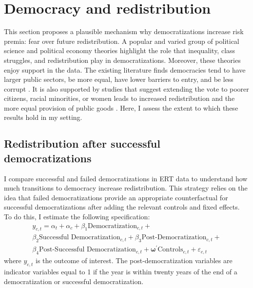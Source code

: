 \section{Democracy and redistribution}\label{section:redistribution}

This section proposes a plausible mechanism why democratizations increase risk premia: fear over future redistribution. A popular and varied group of political science and political economy theories highlight the role that inequality, class struggles, and redistribution play in democratizations.  Moreover, these theories enjoy support in the data. The existing literature finds democracies tend to have larger public sectors, be more equal, have lower barriers to entry, and be less corrupt \citep{Fisman2001,Boix2003,Kolstad2016,Acemoglu2015,Rock2016}. It is also supported by studies that suggest extending the vote to poorer citizens, racial minorities, or women leads to increased redistribution and the more equal provision of public goods \citep{Husted1997,Miller2008,Naidu2012,Cascio2013,Fujiwara2015}. Here, I assess the extent to which these results hold in my setting.

\subsection{Redistribution after successful democratizations}\label{section:redistribution_emp}

I compare successful and failed democratizations in ERT data to understand how much transitions to democracy increase redistribution. This strategy relies on the idea that failed democratizations provide an appropriate counterfactual for successful democratizations after adding the relevant controls and fixed effects. To do this, I estimate the following specification:
\begin{multline}
y_{c,t} = \alpha_{t} + \alpha_{c} + \beta_{1} \textrm{Democratization}_{c,t} + \\ \beta_{2} \textrm{Successful Democratization}_{c,t}  +  \beta_{3} \textrm{Post-Democratization}_{c,t} +  \\ \beta_{4} \textrm{Post-Successful Democratization}_{c,t} +  \mathbf{\omega}^\prime \textrm{Controls}_{c,t} + \varepsilon_{c,t} \label{eq:reg_redistribute}
\end{multline}
where $y_{c,t}$ is the outcome of interest. The post-democratization variables are indicator variables equal to 1 if the year is within twenty years of the end of a democratization or successful democratization. 

